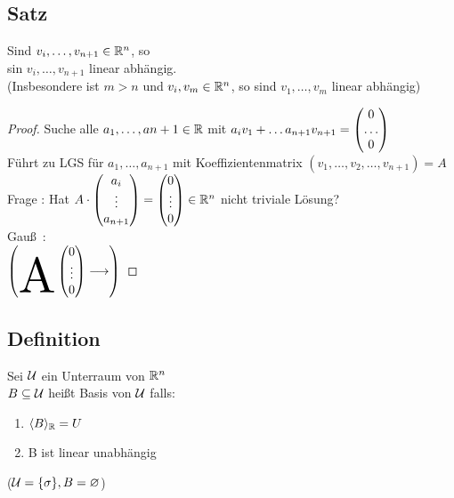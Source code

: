 \subsection{Satz}\label{sec:0.12}
Sind $v_i, \ldots, v_{n+1} \in \mathbb{R}^n$, so\\
sin $v_i,\ldots, v_{n+1}$ linear abhängig.\\
(Insbesondere ist $m > n$ und $v_i,v_m \in \mathbb{R}^n$, so sind $v_1,\ldots,v_m $ linear abhängig)
\begin {proof}
Suche alle $a_1,\ldots,a{n+1} \in \mathbb{R}$ mit $a_iv_1 + \ldots a_{n+1}v_{n+1} = \begin{pmatrix} 0\\\dots\\0 \end{pmatrix}$\\
Führt zu LGS für $a_1,\ldots, a_{n+1}$ mit Koeffizientenmatrix $(v_1,\ldots, v_2, \ldots, v_{n+1}) =A$\\
Frage : Hat $ A \cdot \begin{pmatrix} a_i\\\vdots\\a_{n+1} \end{pmatrix} = \begin{pmatrix} 0\\\vdots\\0 \end{pmatrix} \in \mathbb{R}^n$ nicht triviale Lösung?\\
Gau\ss\ :\\
$\left(\raisebox{-0.5cm}{\scalebox{4}{A}} \vektor0\vdots0 \longrightarrow \right)$
\end {proof}
\subsection{Definition}\label{sec:0.13}
Sei $\mathcal{U}$ ein Unterraum von $\mathbb{R}^n$\\
$B \subseteq \mathcal{U}$ hei\ss t Basis von $\mathcal{U}$ falls:
\begin{enumerate}[(1)]
\item $\langle B \rangle_{\mathbb{R}} = U$
\item B ist linear unabhängig 
\end{enumerate}
($\mathcal{U} = \{\sigma\}, B = \varnothing$)
